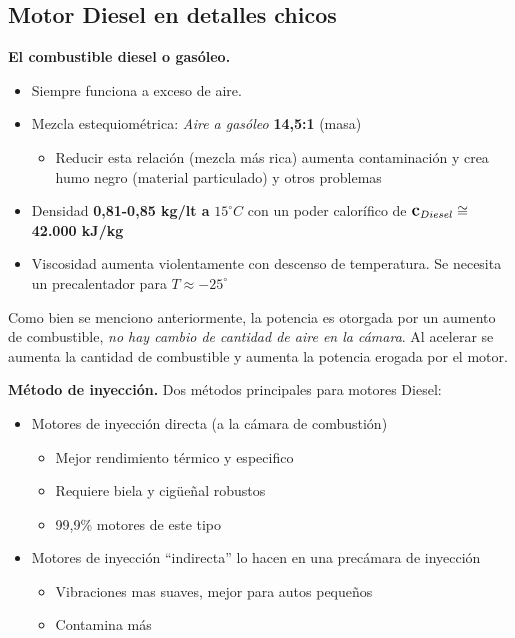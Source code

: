 \subsection{Motor Diesel en detalles chicos}

\textbf{El combustible diesel o gasóleo.} 
\begin{itemize}
    \item Siempre funciona a exceso de aire. 
    \item Mezcla estequiométrica: \textit{Aire a gasóleo} \textbf{14,5:1} (masa)
    \begin{itemize}
        \item Reducir esta relación (mezcla más rica) aumenta contaminación y crea humo negro (material particulado) y otros problemas
    \end{itemize}
    \item Densidad \textbf{0,81-0,85 kg/lt a }$15^\circ C$ con un poder calorífico de $\mbox{\large$\mathbf{c}$}_{Diesel}\cong$ \textbf{42.000 kJ/kg}
    \item Viscosidad aumenta violentamente con descenso de temperatura. Se necesita un precalentador para $T\approx-25^\circ$
\end{itemize}
Como bien se menciono anteriormente, la potencia es otorgada por un aumento de combustible, \textit{no hay cambio de cantidad de aire en la cámara}. Al acelerar se aumenta la cantidad de combustible y aumenta la potencia erogada por el motor.

\textbf{Método de inyección.}
Dos métodos principales para motores Diesel:
\begin{itemize}
    \item Motores de inyección directa (a la cámara de combustión)
    \begin{itemize}
        \item Mejor rendimiento térmico y especifico
        \item Requiere biela y cigüeñal robustos
        \item 99,9\% motores de este tipo
    \end{itemize}
    \item Motores de inyección ``indirecta'' lo hacen en una precámara de inyección
    \begin{itemize}
        \item Vibraciones mas suaves, mejor para autos pequeños
        \item Contamina más
    \end{itemize}
\end{itemize}

